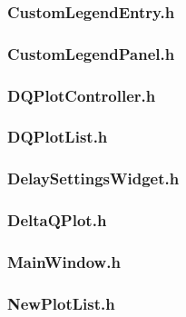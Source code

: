 \subsubsection*{CustomLegendEntry.h}


\subsubsection*{CustomLegendPanel.h}


\subsubsection*{DQPlotController.h}


\subsubsection*{DQPlotList.h}


\subsubsection*{DelaySettingsWidget.h}


\subsubsection*{DeltaQPlot.h}


\subsubsection*{MainWindow.h}


\subsubsection*{NewPlotList.h}


